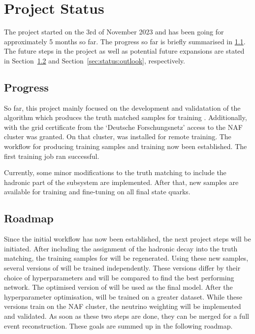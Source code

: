 \documentclass[bachelor,ngerman,english]{GAUBM}
\begin{document}
\chapter{Project Status}
\label{ch:status}
The project started on the 3rd of November 2023 and has been going for approximately 5 months so far. The progress so far is briefly summarised in \ref{sec:status:progress}. The future steps in the project as well as potential future expansions are stated in Section~\ref{sec:status:roadmap} and Section~\ref{sec:status:outlook}, respectively.  


\section{Progress}
\label{sec:status:progress}
So far, this project mainly focused on the development and validatation of the algorithm which produces the truth matched samples for training \spanet. Additionally, with the grid certificate from the `Deutsche Forschungsnetz' access to the NAF cluster was granted. On that cluster, \spanet was installed for remote training. The workflow for producing training samples and training \spanet now been established. The first training job ran successful. 

Currently, some minor modifications to the truth matching to include the hadronic part of the \HWW subsystem are implemented. After that, new samples are available for training and fine-tuning \spanet on all final state quarks.


\section{Roadmap}
\label{sec:status:roadmap}
Since the initial workflow has now been established, the next project steps will be initiated. After including the assignment of the hadronic \HWW decay into the truth matching, the training samples for \spanet will be regenerated. Using these new samples, several versions of \spanet will be trained independently. These versions differ by their choice of hyperparameters and will be compared to find the best performing network. The optimised version of \spanet will be used as the final model. After the hyperparameter optimisation, \spanet will be trained on a greater dataset. While these \spanet versions train on the NAF cluster, the neutrino weighting will be implemented and validated. As soon as these two steps are done, they can be merged for a full event reconstruction. These goals are summed up in the following roadmap.
\end{document}
